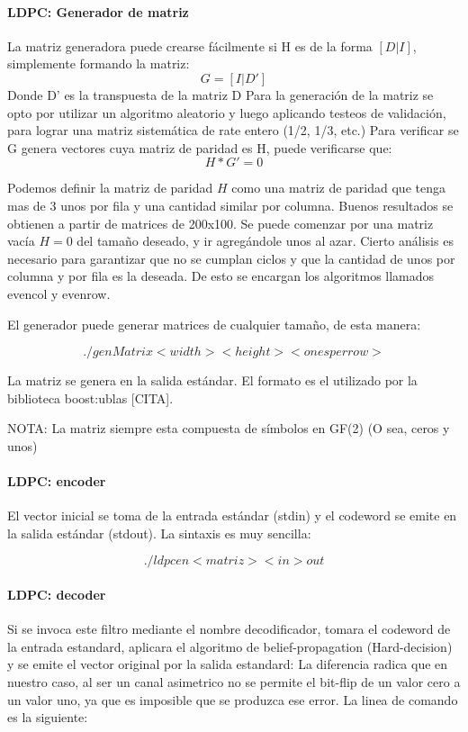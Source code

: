 \paragraph{LDPC: Generador de matriz}
La matriz generadora puede crearse fácilmente si H es de la forma $[D|I]$, simplemente formando la matriz:
$$G=[I|D']$$
Donde D' es la transpuesta de la matriz D
Para la generación de la matriz se opto por utilizar un algoritmo aleatorio y luego aplicando testeos de validación, para lograr una matriz sistemática de rate entero (1/2, 1/3, etc.)
Para verificar se G genera vectores cuya matriz de paridad es H, puede verificarse que:
$$ H*G'=0 $$

Podemos definir la matriz de paridad $H$ como una matriz de paridad que tenga mas de 3 unos por fila y una cantidad similar por columna. Buenos resultados se obtienen a partir de matrices de 200x100.
Se puede comenzar por una matriz vacía $H = 0$ del tamaño deseado, y ir agregándole unos al azar. Cierto análisis es necesario para garantizar que no se cumplan ciclos y que la cantidad de unos por columna y por fila es la deseada. De esto se encargan los algoritmos llamados evencol y evenrow.

El generador puede generar matrices de cualquier tamaño, de esta manera:

$$ ./genMatrix <width> <height> <ones per row>$$

La matriz se genera en la salida estándar. El formato es el utilizado por la biblioteca boost:ublas [CITA].

NOTA: La matriz siempre esta compuesta de símbolos en GF(2) (O sea, ceros y unos)

\paragraph{LDPC: encoder}

El vector inicial se toma de la entrada estándar (stdin) y el codeword se emite en la salida estándar (stdout). La sintaxis es muy sencilla:

$$ ./ldpcen <matriz> < in >out $$
\paragraph{LDPC: decoder}
Si se invoca este filtro mediante el nombre decodificador, tomara el codeword de la entrada estandard, aplicara el algoritmo de belief-propagation (Hard-decision) y se emite el vector original por la salida estandard:
La diferencia radica que en nuestro caso, al ser un canal asimetrico no se permite el bit-flip de un valor cero a un valor uno, ya que es imposible que se produzca ese error.
La linea de comando es la siguiente:

